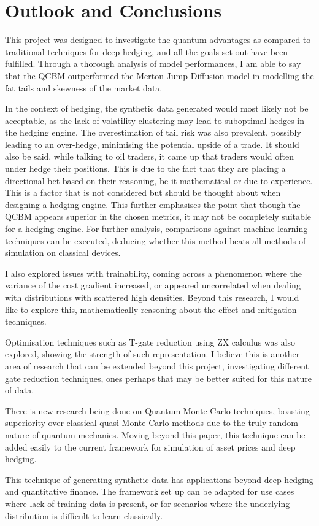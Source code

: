 \documentclass[12pt]{article}
\newcommand{\newp}
    {
    \vskip 0.5cm 
  }
\numberwithin{equation}{section}
\begin{document}
\section{Outlook and Conclusions}
This project was designed to investigate the quantum advantages as compared to 
traditional techniques for deep hedging, and all the goals set out have been 
fulfilled. Through a thorough analysis of model performances, I am able to say that 
the QCBM outperformed the Merton-Jump Diffusion model in modelling the fat tails 
and skewness of the market data. 
\newp
In the context of hedging, the synthetic data generated would most likely not be 
acceptable, as the lack of volatility clustering may lead to suboptimal hedges 
in the hedging engine. The overestimation of tail risk was also prevalent, possibly 
leading to an over-hedge, minimising the potential upside of a trade. It should 
also be said, while talking to oil traders, it came up that traders would often 
under hedge their positions. This is due to the fact that they are placing a directional 
bet based on their reasoning, be it mathematical or due to experience. 
This is a factor that is not considered but should be thought about when designing
a hedging engine. This further emphasises the point that though the QCBM appears 
superior in the chosen metrics, it may not be completely suitable for a hedging 
engine. For further analysis, comparisons against machine learning techniques
can be executed, deducing whether this method beats all methods of simulation on 
classical devices. 
\newp 
I also explored issues with trainability, coming across a phenomenon where the 
variance of the cost gradient increased, or appeared uncorrelated when dealing 
with distributions with scattered high densities. Beyond this research, I would like 
to explore this, mathematically reasoning about the effect and mitigation techniques. 
\newp 
Optimisation techniques such as T-gate reduction using ZX calculus was also 
explored, showing the strength of such representation. I believe this is another 
area of research that can be extended beyond this project, investigating 
different gate reduction techniques, ones perhaps that may be better suited for 
this nature of data. 
\newp
There is new research being done on Quantum Monte Carlo techniques, boasting
superiority over classical quasi-Monte Carlo methods due to the truly random 
nature of quantum mechanics. Moving beyond this paper, this technique can be 
added easily to the current framework for simulation of asset prices and 
deep hedging. 
\newp
This technique of generating synthetic data has applications beyond deep hedging 
and quantitative finance. The framework set up can be adapted for use cases where 
lack of training data is present, or for scenarios where the underlying distribution 
is difficult to learn classically. 
\end{document}
